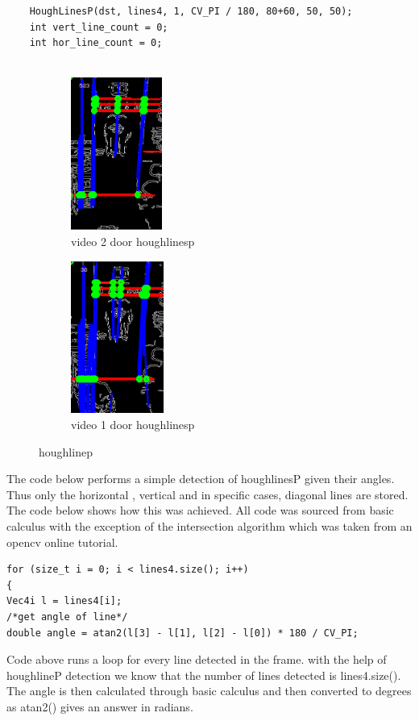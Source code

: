 \documentclass{article}
\begin{document}
\begin{lstlisting}
	HoughLinesP(dst, lines4, 1, CV_PI / 180, 80+60, 50, 50);
	int vert_line_count = 0;
	int hor_line_count = 0;
	
\end{lstlisting}


\begin{figure}[H]
\begin{subfigure}{0.5\textwidth}
\includegraphics[width=0.5\linewidth, height=5cm]{door_closed_h_v.PNG} 
\caption{video 2 door houghlinesp}
\label{fig:subim1}
\end{subfigure}
\begin{subfigure}{0.5\textwidth}
\includegraphics[width=0.5\linewidth, height=5cm]{door2_h_v.PNG}
\caption{video 1 door houghlinesp}
\label{fig:subim2}
\end{subfigure}
\caption{houghlinep}
\label{fig:image2}
\end{figure}


The code below performs a simple detection of houghlinesP given their angles. Thus only the horizontal , vertical and in specific cases, diagonal lines are stored. The code below shows how this was achieved. All code was sourced from basic calculus with the exception of the intersection algorithm which was taken from an opencv online tutorial.

\begin{lstlisting}
for (size_t i = 0; i < lines4.size(); i++)
{
Vec4i l = lines4[i];
/*get angle of line*/
double angle = atan2(l[3] - l[1], l[2] - l[0]) * 180 / CV_PI;
\end{lstlisting}
Code above runs a loop for every line detected in the frame. with the help of houghlineP detection we know that the number of lines detected is lines4.size(). The angle is then calculated through basic calculus and then converted to degrees as atan2() gives an answer in radians.
\end{document}
